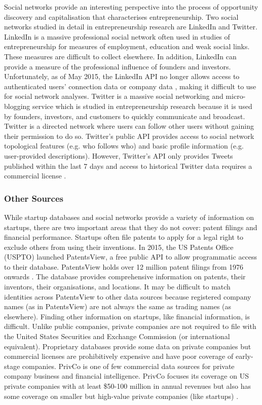 \documentclass[../thesis/thesis.tex]{subfiles}
\begin{document}
Social networks provide an interesting perspective into the process of opportunity discovery and capitalisation that characterises entrepreneurship. Two social networks studied in detail in entrepreneurship research are LinkedIn and Twitter. LinkedIn is a massive professional social network often used in studies of entrepreneurship for measures of employment, education and weak social links. These measures are difficult to collect elsewhere. In addition, LinkedIn can provide a measure of the professional influence of founders and investors. Unfortunately, as of May 2015, the LinkedIn API no longer allows access to authenticated users' connection data or company data \cite{trachtenberg2015}, making it difficult to use for social network analyses. Twitter is a massive social networking and micro-blogging service which is studied in entrepreneurship research because it is used by founders, investors, and customers to quickly communicate and broadcast. Twitter is a directed network where users can follow other users without gaining their permission to do so. Twitter's public API provides access to social network topological features (e.g. who follows who) and basic profile information (e.g. user-provided descriptions). However, Twitter's API only provides Tweets published within the last 7 days and access to historical Twitter data requires a commercial license \cite{puschmann2013}.

\subsubsection{Other Sources}

While startup databases and social networks provide a variety of information on startups, there are two important areas that they do not cover: patent filings and financial performance. Startups often file patents to apply for a legal right to exclude others from using their inventions. In 2015, the US Patents Office (USPTO) launched PatentsView, a free public API to allow programmatic access to their database. PatentsView holds over 12 million patent filings from 1976 onwards \cite{schultz2016}. The database provides comprehensive information on patents, their inventors, their organisations, and locations. It may be difficult to match identities across PatentsView to other data sources because registered company names (as in PatentsView) are not always the same as trading names (as elsewhere). Finding other information on startups, like financial information, is difficult. Unlike public companies, private companies are not required to file with the United States Securities and Exchange Commission (or international equivalent). Proprietary databases provide some data on private companies but commercial licenses are prohibitively expensive and have poor coverage of early-stage companies. PrivCo is one of few commercial data sources for private company business and financial intelligence. PrivCo focuses its coverage on US private companies with at least \$50-100 million in annual revenues but also has some coverage on smaller but high-value private companies (like startups) \cite{artemchik2015}.
\end{document}
